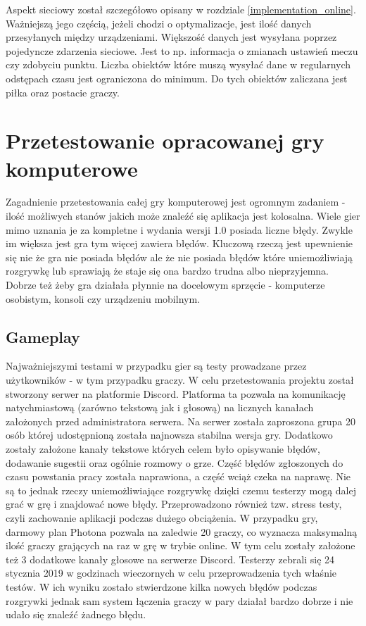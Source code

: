 \documentclass[a4paper,12pt,twoside,openany]{report}
\begin{document}
Aspekt sieciowy został szczegółowo opisany w rozdziale \ref{implementation_online}. Ważniejszą jego częścią, jeżeli chodzi o optymalizacje, jest ilość danych przesyłanych między urządzeniami. Większość danych jest wysyłana poprzez pojedyncze zdarzenia sieciowe. Jest to np. informacja o zmianach ustawień meczu czy zdobyciu punktu. Liczba obiektów które muszą wysyłać dane w regularnych odstępach czasu jest ograniczona do minimum. Do tych obiektów zaliczana jest piłka oraz postacie graczy.

\chapter{Przetestowanie opracowanej gry komputerowe}

Zagadnienie przetestowania całej gry komputerowej jest ogromnym zadaniem - ilość możliwych stanów jakich może znaleźć się aplikacja jest kolosalna. Wiele gier mimo uznania je za kompletne i wydania wersji 1.0 posiada liczne błędy. Zwykle im większa jest gra tym więcej zawiera błędów. Kluczową rzeczą jest upewnienie się nie że gra nie posiada błędów ale że nie posiada błędów które uniemożliwiają rozgrywkę lub sprawiają że staje się ona bardzo trudna albo nieprzyjemna. Dobrze też żeby gra działała płynnie na docelowym sprzęcie - komputerze osobistym, konsoli czy urządzeniu mobilnym. 


\section{Gameplay}

Najważniejszymi testami w przypadku gier są testy prowadzane przez użytkowników - w tym przypadku graczy. W celu przetestowania projektu został stworzony serwer na platformie Discord. Platforma ta pozwala na komunikację natychmiastową (zarówno tekstową jak i głosową) na licznych kanałach założonych przed administratora serwera. Na serwer została zaproszona grupa 20 osób której udostępnioną została najnowsza stabilna wersja gry. Dodatkowo zostały założone kanały tekstowe których celem było opisywanie błędów, dodawanie sugestii oraz ogólnie rozmowy o grze. Część błędów zgłoszonych do czasu powstania pracy została naprawiona, a część wciąż czeka na naprawę. Nie są to jednak rzeczy uniemożliwiające rozgrywkę dzięki czemu testerzy mogą dalej grać w grę i znajdować nowe błędy. Przeprowadzono również tzw. stress testy, czyli zachowanie aplikacji podczas dużego obciążenia. W przypadku gry, darmowy plan Photona pozwala na zaledwie 20 graczy, co wyznacza maksymalną ilość graczy grających na raz w grę w trybie online. W tym celu zostały założone też 3 dodatkowe kanały głosowe na serwerze Discord. Testerzy zebrali się 24 stycznia 2019 w godzinach wieczornych w celu przeprowadzenia tych właśnie testów. W ich wyniku zostało stwierdzone kilka nowych błędów podczas rozgrywki jednak sam system łączenia graczy w pary działał bardzo dobrze i nie udało się znaleźć żadnego błędu.
\end{document}
